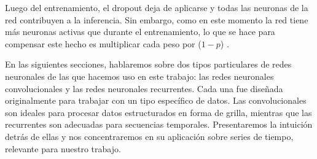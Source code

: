 \documentclass[../../main.tex]{subfiles}
\begin{document}
Luego del entrenamiento, el dropout deja de aplicarse y todas las neuronas de la red
contribuyen a la inferencia. Sin embargo, como en este momento la red tiene más neuronas
activas que durante el entrenamiento, lo que se hace para compensar este hecho es
multiplicar cada peso por (\(1-p\)) \cite{prince2024understanding}.

\bigskip
En las siguientes secciones, hablaremos sobre dos tipos particulares de redes neuronales
de las que hacemos uso en este trabajo: las redes neuronales convolucionales y las redes
neuronales recurrentes. Cada una fue diseñada originalmente para trabajar con un tipo
específico de datos. Las convolucionales son ideales para procesar datos estructurados en
forma de grilla, mientras que las recurrentes son adecuadas para secuencias temporales.
Presentaremos la intuición detrás de ellas y nos concentraremos en su aplicación sobre
series de tiempo, relevante para nuestro trabajo.
\end{document}
